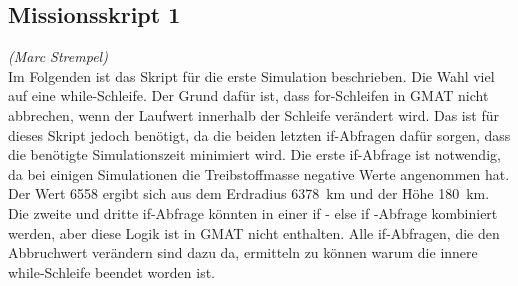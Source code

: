 
\subsection{Missionsskript 1}
\hfill\emph{(Marc Strempel)}\\
Im Folgenden ist das Skript für die erste Simulation beschrieben. Die Wahl viel auf eine while-Schleife. Der Grund dafür ist, dass for-Schleifen in GMAT nicht abbrechen, wenn der Laufwert innerhalb der Schleife verändert wird.
Das ist für dieses Skript jedoch benötigt, da die beiden letzten if-Abfragen dafür sorgen, dass die benötigte Simulationszeit minimiert wird.
Die erste if-Abfrage ist notwendig, da bei einigen Simulationen die Treibstoffmasse negative Werte angenommen hat. Der Wert \num{6558} ergibt sich aus dem Erdradius \SI{6378}{\km} und der Höhe \SI{180}{\km}. Die zweite und dritte if-Abfrage könnten in einer if - else if -Abfrage kombiniert werden, aber diese Logik ist in GMAT nicht enthalten.
Alle if-Abfragen, die den Abbruchwert verändern sind dazu da, ermitteln zu können warum die innere while-Schleife beendet worden ist.\\


